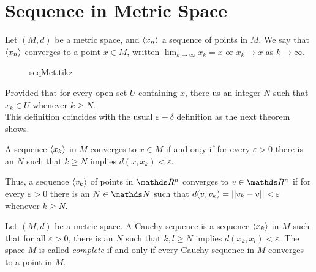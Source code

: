 \documentclass[../main-sheet.tex]{subfiles}
\begin{document}
\section{Sequence in Metric Space}
\begin{defn}
    Let $ (M,d) $ be a metric space, and $ \left<x_n\right> $ a sequence of points in $ M $. We say that $ \left<x_n\right> $ converges to a point $ x\in M $, written $ \lim_{k\to \infty}x_k=x  $ or $ x_k\to x $ as $ k\to\infty $.
\end{defn}
\begin{figure}[H]
    \centering
    {seqMet.tikz}
\end{figure}
Provided that for every open set $ U $ containing $ x $, there us an integer $ N $ such that $ x_k\in U $ whenever $ k\geq N $.\\
This definition coincides with the usual $ \varepsilon-\delta $ definition as the next theorem shows.
\begin{prop}
    A sequence $ \left<x_k\right> $ in $ M $ converges to $ x\in M $ if and on;y if for every $ \varepsilon>0 $ there is an $ N $ such that $ k\geq N $ implies $ d(x,x_k)<\varepsilon $.
\end{prop}


Thus, a sequence $ \left<v_k\right> $ of points in $ \R^n $ converges to $ v\in\R^n $ if for every $ \varepsilon>0 $ there is an $ N\in\N $ such that $ d(v,v_k)=\left\vert\left\vert v_k-v\right\vert\right\vert<\varepsilon $ whenever $ k\geq N $.
\begin{defn}
    Let $ (M,d) $ be a metric space. A Cauchy sequence is a sequence $ \left<x_k\right> $ in $ M $ such that for all $ \varepsilon>0 $, there is an $ N $ such that $ k,l\geq N $ implies $ d(x_k,x_l) <\varepsilon$. The space $ M $ is called \emph{complete} if and only if every Cauchy sequence in $ M $ converges to a point in $ M $.
\end{defn}    
\end{document}
